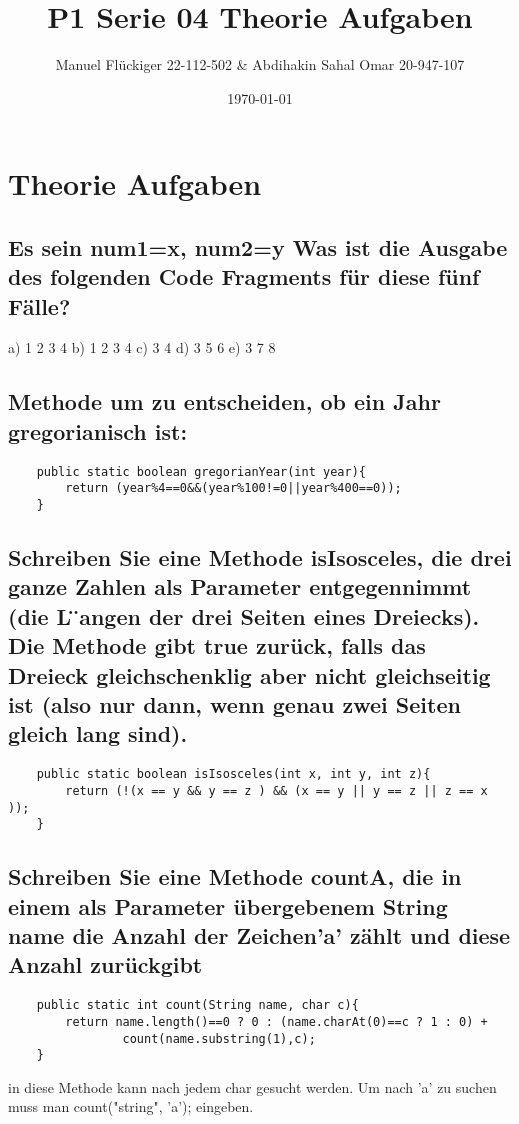 \documentclass{article}
\author{Manuel Flückiger 22-112-502 & Abdihakin Sahal Omar 20-947-107}
\title{P1 Serie 04 Theorie Aufgaben}
\date{\today}
\begin{document}
\maketitle
\section {Theorie Aufgaben}
\subsection{Es sein num1=x, num2=y 
\newline Was ist die Ausgabe des folgenden Code Fragments für diese fünf Fälle?}
    a) 1 2 3 4 \newline
    b) 1 2 3 4 \newline
    c) 3 4 \newline
    d) 3 5 6 \newline
    e) 3 7 8\newline
\subsection{Methode um zu entscheiden, ob ein Jahr gregorianisch ist:}
\begin{verbatim}
    public static boolean gregorianYear(int year){
        return (year%4==0&&(year%100!=0||year%400==0));
    }
\end{verbatim}
\subsection{Schreiben Sie eine Methode isIsosceles, die drei ganze Zahlen als 
Parameter entgegennimmt (die L ̈angen der drei Seiten eines Dreiecks). 
Die Methode  gibt true zurück,  falls  das  Dreieck  gleichschenklig 
aber nicht gleichseitig ist (also nur dann, wenn genau zwei Seiten gleich lang sind).}
\begin{verbatim}
    public static boolean isIsosceles(int x, int y, int z){
        return (!(x == y && y == z ) && (x == y || y == z || z == x ));
    }
\end{verbatim}
\subsection{ Schreiben Sie eine Methode countA, die in einem als Parameter 
übergebenem String name die Anzahl der Zeichen'a' zählt und diese Anzahl zurückgibt}
\begin{verbatim}
    public static int count(String name, char c){
        return name.length()==0 ? 0 : (name.charAt(0)==c ? 1 : 0) + 
                count(name.substring(1),c);
    }
\end{verbatim}
in diese Methode kann nach jedem char gesucht werden. Um nach 'a' zu 
suchen muss man count("string", 'a'); eingeben.
\end{document}
